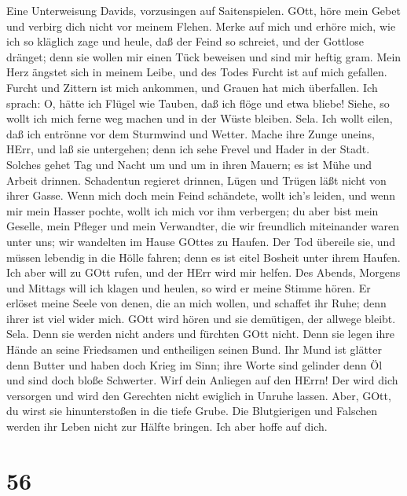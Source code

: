  Eine Unterweisung Davids, vorzusingen auf Saitenspielen.
 GOtt, höre mein Gebet und verbirg dich nicht vor meinem
Flehen.  Merke auf mich und erhöre mich, wie ich so kläglich
zage und heule,  daß der Feind so schreiet, und der Gottlose
dränget; denn sie wollen mir einen Tück beweisen und sind mir heftig
gram.  Mein Herz ängstet sich in meinem Leibe, und des Todes
Furcht ist auf mich gefallen.  Furcht und Zittern ist mich
ankommen, und Grauen hat mich überfallen.  Ich sprach: O,
hätte ich Flügel wie Tauben, daß ich flöge und etwa bliebe! 
Siehe, so wollt ich mich ferne weg machen und in der Wüste bleiben.
Sela.  Ich wollt eilen, daß ich entrönne vor dem Sturmwind
und Wetter.  Mache ihre Zunge uneins, HErr, und laß sie
untergehen; denn ich sehe Frevel und Hader in der Stadt. 
Solches gehet Tag und Nacht um und um in ihren Mauern; es ist Mühe und
Arbeit drinnen.  Schadentun regieret drinnen, Lügen und
Trügen läßt nicht von ihrer Gasse.  Wenn mich doch mein
Feind schändete, wollt ich's leiden, und wenn mir mein Hasser pochte,
wollt ich mich vor ihm verbergen;  du aber bist mein
Geselle, mein Pfleger und mein Verwandter,  die wir
freundlich miteinander waren unter uns; wir wandelten im Hause GOttes zu
Haufen.  Der Tod übereile sie, und müssen lebendig in die
Hölle fahren; denn es ist eitel Bosheit unter ihrem Haufen.
 Ich aber will zu GOtt rufen, und der HErr wird mir helfen.
 Des Abends, Morgens und Mittags will ich klagen und
heulen, so wird er meine Stimme hören.  Er erlöset meine
Seele von denen, die an mich wollen, und schaffet ihr Ruhe; denn ihrer
ist viel wider mich.  GOtt wird hören und sie demütigen,
der allwege bleibt. Sela. Denn sie werden nicht anders und fürchten GOtt
nicht.  Denn sie legen ihre Hände an seine Friedsamen und
entheiligen seinen Bund.  Ihr Mund ist glätter denn Butter
und haben doch Krieg im Sinn; ihre Worte sind gelinder denn Öl und sind
doch bloße Schwerter.  Wirf dein Anliegen auf den HErrn!
Der wird dich versorgen und wird den Gerechten nicht ewiglich in Unruhe
lassen.  Aber, GOtt, du wirst sie hinunterstoßen in die
tiefe Grube. Die Blutgierigen und Falschen werden ihr Leben nicht zur
Hälfte bringen. Ich aber hoffe auf dich.

\hypertarget{section-55}{%
\section{56}\label{section-55}}

